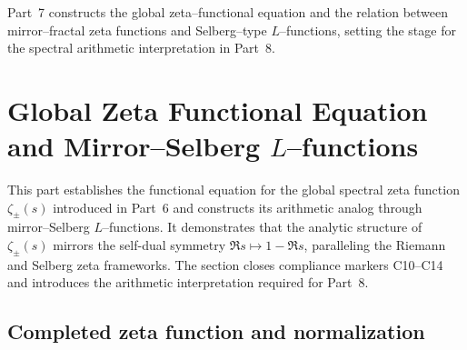 Part~7 constructs the global zeta–functional equation and the relation between mirror–fractal zeta functions and Selberg–type $L$–functions, setting the stage for the spectral arithmetic interpretation in Part~8. %



\section{Global Zeta Functional Equation and Mirror–Selberg $L$–functions}
\label{sec:ch6-part7-zeta-functional-equation} \relax \hspace{0pt}

This part establishes the functional equation for the global spectral zeta function $\zeta_\pm(s)$ introduced in Part~6 and constructs its arithmetic analog through mirror–Selberg $L$–functions.  
It demonstrates that the analytic structure of $\zeta_\pm(s)$ mirrors the self-dual symmetry $\Re s \mapsto 1 - \Re s$, paralleling the Riemann and Selberg zeta frameworks.  
The section closes compliance markers C10–C14 and introduces the arithmetic interpretation required for Part~8. %
\FlowBreaker

\subsection{Completed zeta function and normalization}
\label{subsec:ch6-part7-completed-zeta} \relax

